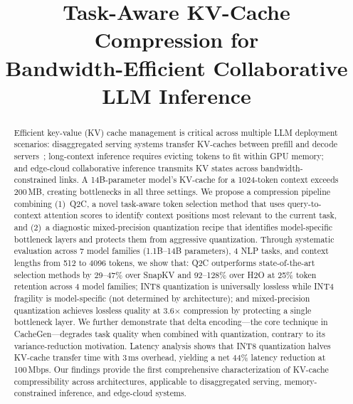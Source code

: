 \documentclass[conference]{IEEEtran}
\newcommand{\QtoC}{\textsc{Q2C}\xspace}
\begin{document}
\title{Task-Aware KV-Cache Compression for\\Bandwidth-Efficient Collaborative LLM Inference}

\author{
}

\maketitle

\begin{abstract}
Efficient key-value (KV) cache management is critical across multiple LLM deployment scenarios: disaggregated serving systems transfer KV-caches between prefill and decode servers~\cite{splitwise,distserve}; long-context inference requires evicting tokens to fit within GPU memory; and edge-cloud collaborative inference transmits KV states across bandwidth-constrained links.
A 14B-parameter model's KV-cache for a 1024-token context exceeds 200\,MB, creating bottlenecks in all three settings.
We propose a compression pipeline combining (1)~\QtoC, a novel task-aware token selection method that uses query-to-context attention scores to identify context positions most relevant to the current task, and (2)~a diagnostic mixed-precision quantization recipe that identifies model-specific bottleneck layers and protects them from aggressive quantization.
Through systematic evaluation across 7 model families (1.1B--14B parameters), 4 NLP tasks, and context lengths from 512 to 4096 tokens, we show that:
\QtoC outperforms state-of-the-art selection methods by 29--47\% over SnapKV and 92--128\% over H2O at 25\% token retention across 4 model families;
INT8 quantization is universally lossless while INT4 fragility is model-specific (not determined by architecture);
and mixed-precision quantization achieves lossless quality at 3.6$\times$ compression by protecting a single bottleneck layer.
We further demonstrate that delta encoding---the core technique in CacheGen---degrades task quality when combined with quantization, contrary to its variance-reduction motivation.
Latency analysis shows that INT8 quantization halves KV-cache transfer time with 3\,ms overhead, yielding a net 44\% latency reduction at 100\,Mbps.
Our findings provide the first comprehensive characterization of KV-cache compressibility across architectures, applicable to disaggregated serving, memory-constrained inference, and edge-cloud systems.
\end{abstract}
\end{document}

